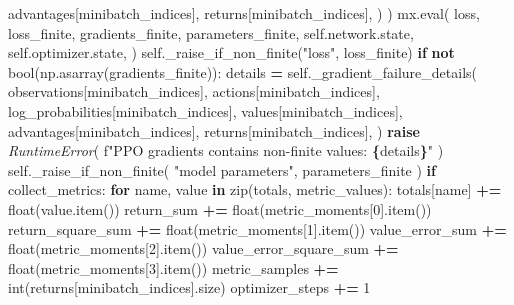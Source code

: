 \documentclass[
  chinese,
  11pt,
  letterpaper,
]{article}
\newenvironment{Shaded}{\begin{snugshade}}{\end{snugshade}}
\newcommand{\BuiltInTok}[1]{#1}
\newcommand{\ControlFlowTok}[1]{\textcolor[rgb]{0.13,0.29,0.53}{\textbf{#1}}}
\newcommand{\DecValTok}[1]{\textcolor[rgb]{0.00,0.00,0.81}{#1}}
\newcommand{\KeywordTok}[1]{\textcolor[rgb]{0.13,0.29,0.53}{\textbf{#1}}}
\newcommand{\NormalTok}[1]{#1}
\newcommand{\OperatorTok}[1]{\textcolor[rgb]{0.81,0.36,0.00}{\textbf{#1}}}
\newcommand{\PreprocessorTok}[1]{\textcolor[rgb]{0.56,0.35,0.01}{\textit{#1}}}
\newcommand{\SpecialCharTok}[1]{\textcolor[rgb]{0.81,0.36,0.00}{\textbf{#1}}}
\newcommand{\SpecialStringTok}[1]{\textcolor[rgb]{0.31,0.60,0.02}{#1}}
\newcommand{\StringTok}[1]{\textcolor[rgb]{0.31,0.60,0.02}{#1}}
\newcommand{\VariableTok}[1]{\textcolor[rgb]{0.00,0.00,0.00}{#1}}
\renewenvironment{Shaded}{\par\smallskip}{\par\smallskip}
\begin{document}
\begin{Shaded}
\begin{Highlighting}[]
\NormalTok{                            advantages[minibatch\_indices],}
\NormalTok{                            returns[minibatch\_indices],}
\NormalTok{                        )}
\NormalTok{                    )}
\NormalTok{                mx.}\BuiltInTok{eval}\NormalTok{(}
\NormalTok{                    loss,}
\NormalTok{                    loss\_finite,}
\NormalTok{                    gradients\_finite,}
\NormalTok{                    parameters\_finite,}
                    \VariableTok{self}\NormalTok{.network.state,}
                    \VariableTok{self}\NormalTok{.optimizer.state,}
\NormalTok{                )}
                \VariableTok{self}\NormalTok{.\_raise\_if\_non\_finite(}\StringTok{"loss"}\NormalTok{, loss\_finite)}
                \ControlFlowTok{if} \KeywordTok{not} \BuiltInTok{bool}\NormalTok{(np.asarray(gradients\_finite)):}
\NormalTok{                    details }\OperatorTok{=} \VariableTok{self}\NormalTok{.\_gradient\_failure\_details(}
\NormalTok{                        observations[minibatch\_indices],}
\NormalTok{                        actions[minibatch\_indices],}
\NormalTok{                        log\_probabilities[minibatch\_indices],}
\NormalTok{                        values[minibatch\_indices],}
\NormalTok{                        advantages[minibatch\_indices],}
\NormalTok{                        returns[minibatch\_indices],}
\NormalTok{                    )}
                    \ControlFlowTok{raise} \PreprocessorTok{RuntimeError}\NormalTok{(}
                        \SpecialStringTok{f"PPO gradients contains non{-}finite values: }\SpecialCharTok{\{}\NormalTok{details}\SpecialCharTok{\}}\SpecialStringTok{"}
\NormalTok{                    )}
                \VariableTok{self}\NormalTok{.\_raise\_if\_non\_finite(}
                    \StringTok{"model parameters"}\NormalTok{, parameters\_finite}
\NormalTok{                )}
                \ControlFlowTok{if}\NormalTok{ collect\_metrics:}
                    \ControlFlowTok{for}\NormalTok{ name, value }\KeywordTok{in} \BuiltInTok{zip}\NormalTok{(totals, metric\_values):}
\NormalTok{                        totals[name] }\OperatorTok{+=} \BuiltInTok{float}\NormalTok{(value.item())}
\NormalTok{                    return\_sum }\OperatorTok{+=} \BuiltInTok{float}\NormalTok{(metric\_moments[}\DecValTok{0}\NormalTok{].item())}
\NormalTok{                    return\_square\_sum }\OperatorTok{+=} \BuiltInTok{float}\NormalTok{(metric\_moments[}\DecValTok{1}\NormalTok{].item())}
\NormalTok{                    value\_error\_sum }\OperatorTok{+=} \BuiltInTok{float}\NormalTok{(metric\_moments[}\DecValTok{2}\NormalTok{].item())}
\NormalTok{                    value\_error\_square\_sum }\OperatorTok{+=} \BuiltInTok{float}\NormalTok{(metric\_moments[}\DecValTok{3}\NormalTok{].item())}
\NormalTok{                    metric\_samples }\OperatorTok{+=} \BuiltInTok{int}\NormalTok{(returns[minibatch\_indices].size)}
\NormalTok{                    optimizer\_steps }\OperatorTok{+=} \DecValTok{1}


\end{Highlighting}
\end{Shaded}
\end{document}
